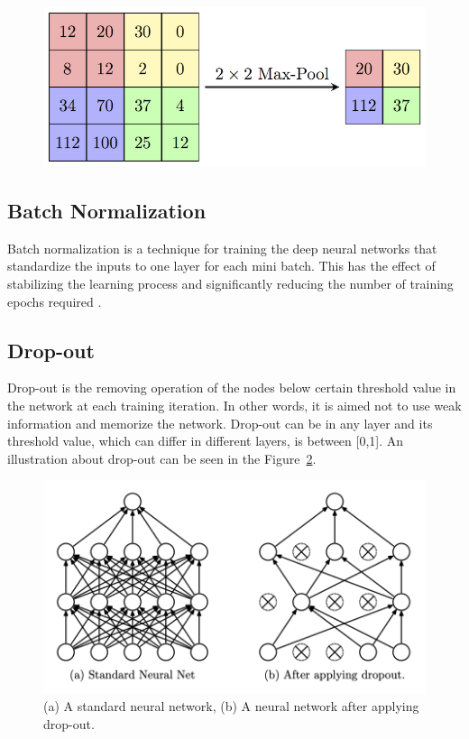 \begin{figure}[h]
    \centering
    \includegraphics[width=.8\linewidth]{fig/MaxpoolSample.png}
    \label{fig:maxpooling}
\end{figure}

\subsection{Batch Normalization}

Batch normalization is a technique for training the deep neural networks that standardize the inputs to one layer for each mini batch. This has the effect of stabilizing the learning process and significantly reducing the number of training epochs required \cite{A_novelCNNModel}.

\subsection{Drop-out}

Drop-out is the removing operation of the nodes below certain threshold value in the network at each training iteration. In other words, it is aimed not to use weak information and memorize the network. Drop-out can be in any layer and its threshold value, which can differ in different layers,  is between [0,1]. An illustration about drop-out can be seen in the Figure~\ref{fig:dropout}.

\begin{figure}[h]
    \centering
    \includegraphics[width=.8\linewidth]{fig/dropout.png}
    \caption{(a) A standard neural network, (b) A neural network after applying drop-out\cite{dropout_article}.}
    \label{fig:dropout}
\end{figure}

